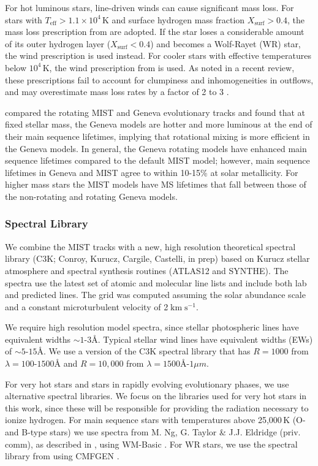\documentclass[preprint2]{aastex61}
\newcommand{\ang}{\ensuremath{\mbox{\AA}}\xspace}
\newcommand{\kms}{\ensuremath{\;\mathrm{km}\;\mathrm{s}^{-1}}\xspace}
\begin{document}
For hot luminous stars, line-driven winds can cause significant mass loss. For stars with $T_{\mathrm{eff}}>1.1\times10^4\,$K and surface hydrogen mass fraction $X_{\mathrm{surf}}>0.4$, the mass loss prescription from \citet{Vink+2000, Vink+2001} are adopted. If the star loses a considerable amount of its outer hydrogen layer ($X_{\mathrm{surf}}<0.4$) and becomes a Wolf-Rayet (WR) star, the \citet{Nugis+2000} wind prescription is used instead. For cooler stars with effective temperatures below $10^4\,$K, the wind prescription from \citet{deJager+1988} is used. As noted in a recent review, these prescriptions fail to account for clumpiness and inhomogeneities in outflows, and may overestimate mass loss rates by a factor of 2 to 3 \citep{Smith+2014}.

\citet{Choi+2016} compared the rotating MIST and Geneva evolutionary tracks and found that at fixed stellar mass, the Geneva models are hotter and more luminous at the end of their main sequence lifetimes, implying that rotational mixing is more efficient in the Geneva models. In general, the Geneva rotating models have enhanced main sequence lifetimes compared to the default MIST model; however, main sequence lifetimes in Geneva and MIST agree to within 10-15\% at solar metallicity. For higher mass stars the MIST models have MS lifetimes that fall between those of the non-rotating and rotating Geneva models.

\subsubsection{Spectral Library}

We combine the MIST tracks with a new, high resolution theoretical spectral library (C3K; Conroy, Kurucz, Cargile, Castelli, in prep) based on Kurucz stellar atmosphere and spectral synthesis routines (ATLAS12 and SYNTHE). The spectra use the latest set of atomic and molecular line lists and include both lab and predicted lines. The grid was computed assuming the \citet{Asplund+2009} solar abundance scale and a constant microturbulent velocity of 2\kms.

We require high resolution model spectra, since stellar photospheric lines have equivalent widths ${\sim}1$-$3$\ang. Typical stellar wind lines have equivalent widths (EWs) of ${\sim}5$-$15$\ang. We use a version of the C3K spectral library that has $R=1000$ from $\lambda=100$-$1500$\ang and $R=10,000$ from $\lambda=1500$\ang-$1\mu m$. 

For very hot stars and stars in rapidly evolving evolutionary phases, we use alternative spectral libraries. We focus on the libraries used for very hot stars in this work, since these will be responsible for providing the radiation necessary to ionize hydrogen. For main sequence stars with temperatures above 25,000$\,$K (O- and B-type stars) we use spectra from M. Ng, G. Taylor \& J.J. Eldridge (priv. comm),  as described in \citet{Eldridge+2017}, using WM-Basic \citep{Pauldrach+2001}. For WR stars, we use the spectral library from \citet{Smith+2002} using CMFGEN \citep{Hillier+2001}.
\end{document}
